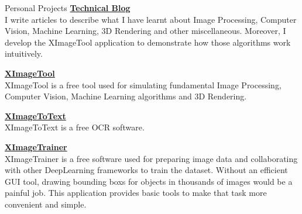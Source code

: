 \documentclass{resume}
\begin{document}
	\begin{rSection}{Personal Projects}
		{\bf \href{https://noidh.github.io/blog.html}{Technical Blog}}
		\\ I write articles to describe what I have learnt about Image Processing, Computer Vision, Machine Learning, 3D Rendering and other miscellaneous.  Moreover,  I develop the XImageTool application to demonstrate how those algorithms work intuitively.

		{\bf  \href{https://noidh.github.io/pages/sw/ximagetool/ximagetool.html}{XImageTool}}
		\\ XImageTool is a free tool used for simulating fundamental Image Processing, Computer Vision, Machine Learning algorithms and 3D Rendering.

		{\bf \href{https://noidh.github.io/pages/sw/ximage2text/ximagetotext.html}{XImageToText}}
		\\ XImageToText is a free OCR software.

		{\bf \href{https://noidh.github.io/pages/sw/ximage_trainer/ximage_trainer.html}{XImageTrainer}}
		\\XImageTrainer is a free software used for preparing image data and collaborating with other DeepLearning frameworks to train the dataset. Without an efficient GUI tool, drawing bounding boxs for objects in thousands of images would be a painful job.  This application provides basic tools to make that task more convenient and simple.	
	\end{rSection}
\end{document}
